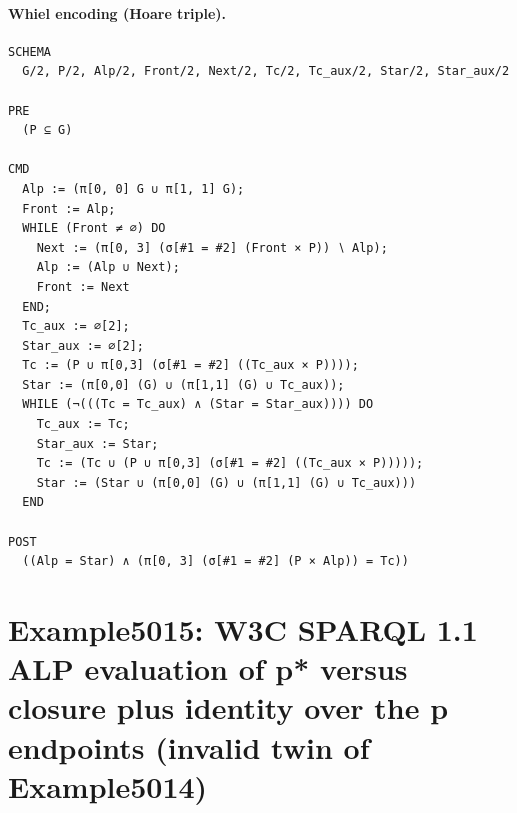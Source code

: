 \documentclass[10pt]{article}
\begin{document}
\paragraph{Whiel encoding (Hoare triple).}

\begin{Verbatim}[fontsize=\scriptsize,breaklines=true,breakanywhere=true,frame=single,framesep=1.5mm]
SCHEMA
  G/2, P/2, Alp/2, Front/2, Next/2, Tc/2, Tc_aux/2, Star/2, Star_aux/2

PRE
  (P ⊆ G) 

CMD
  Alp := (π[0, 0] G ∪ π[1, 1] G);
  Front := Alp;
  WHILE (Front ≠ ∅) DO
    Next := (π[0, 3] (σ[#1 = #2] (Front × P)) ∖ Alp);
    Alp := (Alp ∪ Next);
    Front := Next
  END;
  Tc_aux := ∅[2];
  Star_aux := ∅[2];
  Tc := (P ∪ π[0,3] (σ[#1 = #2] ((Tc_aux × P))));
  Star := (π[0,0] (G) ∪ (π[1,1] (G) ∪ Tc_aux));
  WHILE (¬(((Tc = Tc_aux) ∧ (Star = Star_aux)))) DO
    Tc_aux := Tc;
    Star_aux := Star;
    Tc := (Tc ∪ (P ∪ π[0,3] (σ[#1 = #2] ((Tc_aux × P)))));
    Star := (Star ∪ (π[0,0] (G) ∪ (π[1,1] (G) ∪ Tc_aux)))
  END

POST
  ((Alp = Star) ∧ (π[0, 3] (σ[#1 = #2] (P × Alp)) = Tc))
\end{Verbatim}

\Needspace{0.45\textheight}

\section{Example5015: W3C SPARQL 1.1 ALP evaluation of p* versus closure plus identity over the p endpoints (invalid twin of Example5014)}\label{case:Example5015}
\end{document}

